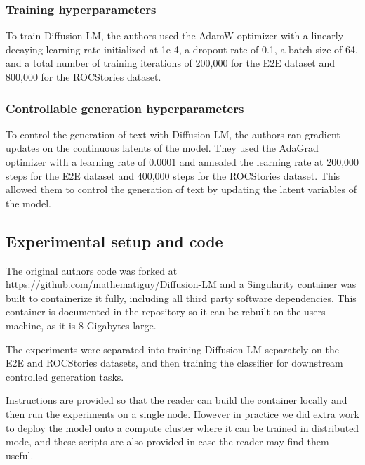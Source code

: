 \subsubsection{Training hyperparameters}
To train Diffusion-LM, the authors used the AdamW optimizer with a linearly decaying learning rate initialized at 1e-4, a dropout rate of 0.1, a batch size of 64, and a total number of training iterations of 200,000 for the E2E dataset and 800,000 for the ROCStories dataset.

\subsubsection{Controllable generation hyperparameters}

To control the generation of text with Diffusion-LM, the authors ran gradient updates on the continuous latents of the model. They used the AdaGrad optimizer with a learning rate of 0.0001 and annealed the learning rate at 200,000 steps for the E2E dataset and 400,000 steps for the ROCStories dataset. This allowed them to control the generation of text by updating the latent variables of the model.

\subsection{Experimental setup and code}


The original authors code was forked at \href{https://github.com/mathematiguy/Diffusion-LM}{https://github.com/mathematiguy/Diffusion-LM} and a Singularity container was built to containerize it fully, including all third party software dependencies. This container is documented in the repository so it can be rebuilt on the users machine, as it is 8 Gigabytes large.

The experiments were separated into training Diffusion-LM separately on the E2E and ROCStories datasets, and then training the classifier for downstream controlled generation tasks.

Instructions are provided so that the reader can build the container locally and then run the experiments on a single node. However in practice we did extra work to deploy the model onto a compute cluster where it can be trained in distributed mode, and these scripts are also provided in case the reader may find them useful.

